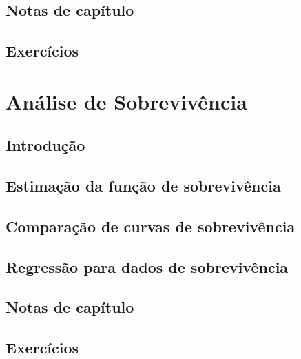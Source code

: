 \documentclass[
]{latex/krantz}
\theoremstyle{definition}
\theoremstyle{definition}
\theoremstyle{definition}
\theoremstyle{definition}
\theoremstyle{remark}
\begin{document}
\hypertarget{notas-de-capuxedtulo-4}{%
\section{Notas de capítulo}\label{notas-de-capuxedtulo-4}}

\hypertarget{exercuxedcios-4}{%
\section{Exercícios}\label{exercuxedcios-4}}

\hypertarget{anuxe1lise-de-sobrevivuxeancia}{%
\chapter{Análise de Sobrevivência}\label{anuxe1lise-de-sobrevivuxeancia}}

\hypertarget{introduuxe7uxe3o-5}{%
\section{Introdução}\label{introduuxe7uxe3o-5}}

\hypertarget{estimauxe7uxe3o-da-funuxe7uxe3o-de-sobrevivuxeancia}{%
\section{Estimação da função de sobrevivência}\label{estimauxe7uxe3o-da-funuxe7uxe3o-de-sobrevivuxeancia}}

\hypertarget{comparauxe7uxe3o-de-curvas-de-sobrevivuxeancia}{%
\section{Comparação de curvas de sobrevivência}\label{comparauxe7uxe3o-de-curvas-de-sobrevivuxeancia}}

\hypertarget{regressuxe3o-para-dados-de-sobrevivuxeancia}{%
\section{Regressão para dados de sobrevivência}\label{regressuxe3o-para-dados-de-sobrevivuxeancia}}

\hypertarget{notas-de-capuxedtulo-5}{%
\section{Notas de capítulo}\label{notas-de-capuxedtulo-5}}

\hypertarget{exercuxedcios-5}{%
\section{Exercícios}\label{exercuxedcios-5}}
\end{document}

